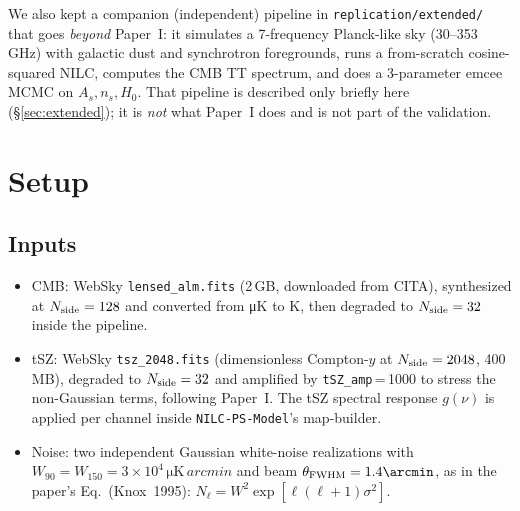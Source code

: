 \documentclass[11pt]{article}
\begin{document}
We also kept a companion (independent) pipeline in
\texttt{replication/extended/} that goes \emph{beyond} Paper~I: it simulates a
7-frequency Planck-like sky (30--353\,GHz) with galactic dust and
synchrotron foregrounds, runs a from-scratch cosine-squared NILC, computes
the CMB TT spectrum, and does a 3-parameter emcee MCMC on $A_s,n_s,H_0$.
That pipeline is described only briefly here (\S\ref{sec:extended}); it is
\emph{not} what Paper~I does and is not part of the validation.

\section{Setup}\label{sec:setup}

\subsection{Inputs}
\begin{itemize}
  \item CMB: WebSky \texttt{lensed\_alm.fits} (2\,GB, downloaded from CITA),
    synthesized at $N_{\rm side}=128$ and converted from
    \si{\micro\kelvin} to K, then degraded to $N_{\rm side}=32$ inside the
    pipeline.
  \item tSZ: WebSky \texttt{tsz\_2048.fits} (dimensionless Compton-$y$ at
    $N_{\rm side}=2048$, 400\,MB), degraded to $N_{\rm side}=32$ and
    amplified by \texttt{tSZ\_amp}\,=\,1000 to stress the non-Gaussian
    terms, following Paper~I.  The tSZ spectral response $g(\nu)$ is
    applied per channel inside \texttt{NILC-PS-Model}'s map-builder.
  \item Noise: two independent Gaussian white-noise realizations with
    $W_{90}=W_{150}=3\times10^{4}\,\si{\micro\kelvin\,arcmin}$ and beam
    $\theta_{\rm FWHM}=1.4\arcmin$, as in the paper's Eq.\ (Knox~1995):
    $N_\ell = W^2 \exp[\ell(\ell+1)\sigma^2]$.
\end{itemize}
\end{document}
